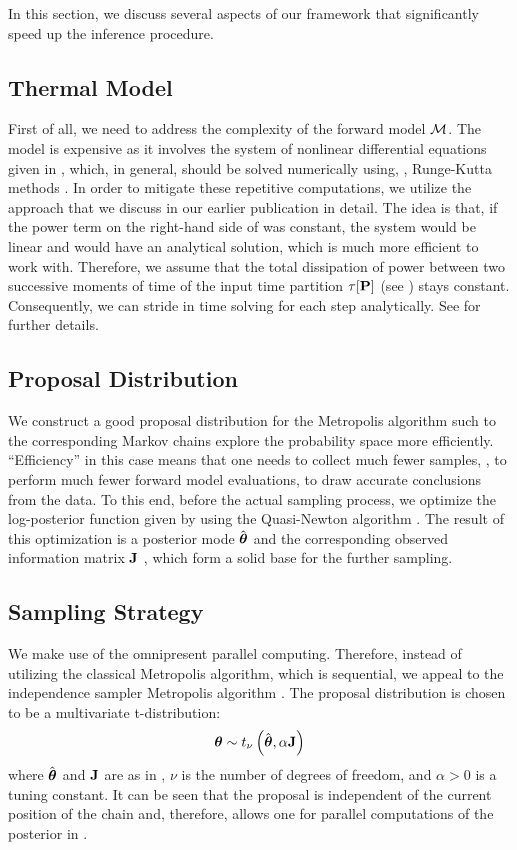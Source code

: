 In this section, we discuss several aspects of our framework that significantly speed up the inference procedure.

\subsection{Thermal Model}
First of all, we need to address the complexity of the forward model $\model$. The model is expensive as it involves the system of nonlinear differential equations given in , which, in general, should be solved numerically using, \eg, Runge-Kutta methods \cite{press2007}. In order to mitigate these repetitive computations, we utilize the approach that we discuss in our earlier publication \cite{ukhov2012} in detail. The idea is that, if the power term on the right-hand side of  was constant, the system would be linear and would have an analytical solution, which is much more efficient to work with. Therefore, we assume that the total dissipation of power between two successive moments of time of the input time partition $\tau[\mathbf{P}]$ (see ) stays constant. Consequently, we can stride in time solving  for each step analytically. See \cite{ukhov2012} for further details.

\subsection{Proposal Distribution} 
We construct a good proposal distribution for the Metropolis algorithm such to the corresponding Markov chains explore the probability space more efficiently. ``Efficiency'' in this case means that one needs to collect much fewer samples, \ie, to perform much fewer forward model evaluations, to draw accurate conclusions from the data. To this end, before the actual sampling process, we optimize the log-posterior function given by  using the Quasi-Newton algorithm \cite{press2007}. The result of this optimization is a posterior mode $\hat{{\boldsymbol\theta}}$ and the corresponding observed information matrix $\mathbf{J}$ \cite{gelman2004}, which form a solid base for the further sampling.

\subsection{Sampling Strategy}
We make use of the omnipresent parallel computing. Therefore, instead of utilizing the classical Metropolis algorithm, which is sequential, we appeal to the independence sampler Metropolis algorithm \cite{gelman2004}. The proposal distribution is chosen to be a multivariate t-distribution:
\[
  {\boldsymbol\theta} \sim t_{\nu}\left( \hat{{\boldsymbol\theta}}, \alpha \mathbf{J} \right)
\]
where $\hat{{\boldsymbol\theta}}$ and $\mathbf{J}$ are as in , $\nu$ is the number of degrees of freedom, and $\alpha > 0$ is a tuning constant. It can be seen that the proposal is independent of the current position of the chain and, therefore, allows one for parallel computations of the posterior in .
